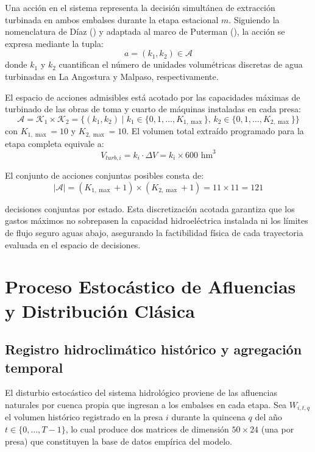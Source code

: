 \documentclass[
  spanish,
  letterpaper,
]{scrreprt}
\theoremstyle{definition}
\theoremstyle{remark}
\begin{document}
Una acción en el sistema representa la decisión simultánea de extracción
turbinada en ambos embalses durante la etapa estacional \(m\). Siguiendo
la nomenclatura de Díaz () y adaptada al
marco de Puterman (), la acción
se expresa mediante la tupla: \[a = (k_1, k_2) \in \mathcal{A}\] donde
\(k_1\) y \(k_2\) cuantifican el número de unidades volumétricas
discretas de agua turbinadas en La Angostura y Malpaso, respectivamente.

El espacio de acciones admisibles está acotado por las capacidades
máximas de turbinado de las obras de toma y cuarto de máquinas
instaladas en cada presa:
\[\mathcal{A} = \mathcal{K}_1 \times \mathcal{K}_2 = \big\{ (k_1, k_2) \mid k_1 \in \{0, 1, \dots, K_{1,\max}\}, \, k_2 \in \{0, 1, \dots, K_{2,\max}\} \big\}\]
con \(K_{1,\max} = 10\) y \(K_{2,\max} = 10\). El volumen total extraído
programado para la etapa completa equivale a:
\[V_{turb,i} = k_i \cdot \Delta V = k_i \times 600\text{ hm}^3\]

El conjunto de acciones conjuntas posibles consta de:
\[|\mathcal{A}| = (K_{1,\max} + 1) \times (K_{2,\max} + 1) = 11 \times 11 = 121\]

decisiones conjuntas por estado. Esta discretización acotada garantiza
que los gastos máximos no sobrepasen la capacidad hidroeléctrica
instalada ni los límites de flujo seguro aguas abajo, asegurando la
factibilidad física de cada trayectoria evaluada en el espacio de
decisiones.

\section{Proceso Estocástico de Afluencias y Distribución
Clásica}\label{sec-afluencias}

\subsection{Registro hidroclimático histórico y agregación
temporal}\label{registro-hidroclimuxe1tico-histuxf3rico-y-agregaciuxf3n-temporal}

El disturbio estocástico del sistema hidrológico proviene de las
afluencias naturales por cuenca propia que ingresan a los embalses en
cada etapa. Sea \(W_{i,t,q}\) el volumen histórico registrado en la
presa \(i\) durante la quincena \(q\) del año
\(t \in \{0, \dots, T-1\}\), lo cual produce dos matrices de dimensión
\(50 \times 24\) (una por presa) que constituyen la base de datos
empírica del modelo.
\end{document}
